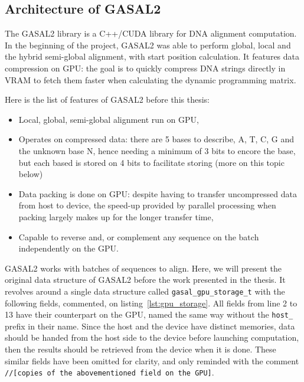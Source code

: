 \subsection{Architecture of GASAL2}
The GASAL2 library is a C++/CUDA library for DNA alignment computation. In the beginning of the project, GASAL2 was able to perform global, local and the hybrid semi-global alignment, with start position calculation. It features data compression on GPU: the goal is to quickly compress DNA strings directly in VRAM to fetch them faster when calculating the dynamic programming matrix.

Here is the list of features of GASAL2 before this thesis:

\begin{itemize}
	\item Local, global, semi-global alignment run on GPU,
	\item Operates on compressed data: there are 5 bases to describe, A, T, C, G and the unknown base N, hence needing a minimum of 3 bits to encore the base, but each based is stored on 4 bits to facilitate storing (more on this topic below)
	\item Data packing is done on GPU: despite having to transfer uncompressed data from host to device, the speed-up provided by parallel processing when packing largely makes up for the longer transfer time,
	\item Capable to reverse and, or complement any sequence on the batch independently on the GPU.
\end{itemize}

GASAL2 works with batches of sequences to align. Here, we will present the original data structure of GASAL2 before the work presented in the thesis. It revolves around a single data structure called \verb|gasal_gpu_storage_t| with the following fields, commented, on listing~\ref{lst:gpu_storage}. All fields from line 2 to 13 have their counterpart on the GPU, named the same way without the \verb|host_| prefix in their name. Since the host and the device have distinct memories, data should be handed from the host side to the device before launching computation, then the results should be retrieved from the device when it is done.  
These similar fields have been omitted for clarity, and only reminded with the comment \verb|//[copies of the abovementioned field on the GPU]|.

